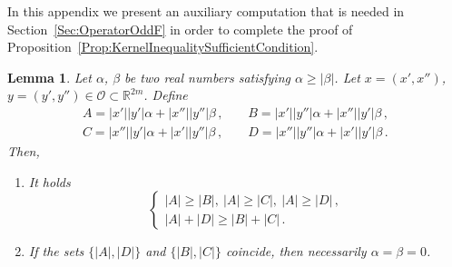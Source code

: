 \documentclass[12pt,reqno]{amsart}
\newtheorem{lemma}[theorem]{Lemma}
\theoremstyle{definition}
\theoremstyle{remark}
\newcommand{\con}[1]{\mathbb{#1}}
\newcommand{\R}{\con{R}} %
\newcommand{\ocal}{\mathcal{O}}
\numberwithin{equation}{section}
\begin{document}
In this appendix we present an auxiliary computation that is needed in Section~\ref{Sec:OperatorOddF} in order to complete the proof of Proposition~\ref{Prop:KernelInequalitySufficientCondition}.

\begin{lemma}
	\label{Lemma:ComputationABCD} Let $\alpha$, $\beta$ be two real numbers satisfying $\alpha \geq
	|\beta|$. Let $x=(x',x'')$, $y=(y',y'')\in \ocal \subset \R^{2m}$. Define
	$$
	\begin{array}{cc}
	A = |x'||y'|  \alpha + |x''||y''|\beta \,, \ \ \ \ \ &
	B = |x'||y''| \alpha + |x''||y'| \beta \,, \\
	C = |x''||y'| \alpha + |x'||y''| \beta \,, \ \ \ \ \ &
	D = |x''||y''|\alpha + |x'||y'|  \beta \,.
	\end{array}
	$$
	Then,
	\begin{enumerate}
		\item It holds
		$$
		\begin{cases}
		|A| \geq |B|,\ |A| \geq|C|, \ |A| \geq|D|\,, \\
		|A| + |D| \geq |B| + |C|\,.
		\end{cases}
		$$
		\item If  the sets $\{|A|,|D|\}$ and $\{|B|,|C|\}$ coincide, then necessarily $\alpha = \beta = 0$.
	\end{enumerate}
	
\end{lemma}
\end{document}
